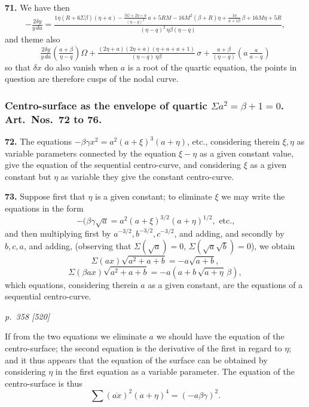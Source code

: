 \documentclass[11pt,a4paper]{book}
\begin{document}
\textbf{71.} We have then
\[
-\tfrac{2\delta y}{y\,da} = \tfrac{1\eta(R + 6\Sigma\beta)(\eta + a) - \tfrac{5G + 2\eta + a}{(\eta - q)^2}\,a + 5RM - 16M^2(\beta + R)\eta + \tfrac{1\eta}{a + 1\beta}\,\beta + 16M\eta + 5R}{(\eta - q)^2\,\eta\beta(\eta - q)},
\]
and theme also
\[
\tfrac{2\delta y}{y\,da}\!\!\left(\tfrac{a + \beta}{\eta - q}\!\right)\Omega + \tfrac{(2\eta + a)(2\eta + a)(\eta + a + a + 1)}{(\eta - q)\,\eta\beta}\,\sigma + \tfrac{a + \beta}{(\eta - q)}\!\left(a\,\tfrac{a}{a - q}\right)
\]
so that $\delta x$ do also vanish when $a$ is a root of the quartic equation, the points in question are therefore cusps of the nodal curve.

\subsubsection*{Centro-surface as the envelope of quartic $\Sigma a^2 = \beta + 1 = 0$. Art.\ Nos.\ 72 to 76.}

\textbf{72.} The equations $-\beta\gamma x^2 = a^2(a + \xi)^3(a + \eta)$, etc., considering therein $\xi, \eta$ as variable parameters connected by the equation $\xi - \eta$ as a given constant value, give the equation of the sequential centro-curve, and considering $\xi$ as a given constant but $\eta$ as variable they give the constant centro-curve.

\textbf{73.} Suppose first that $\eta$ is a given constant; to eliminate $\xi$ we may write the equations in the form
\[
-(\beta\gamma\sqrt{a} = a^2(a + \xi)^{3/2}(a + \eta)^{1/2},\text{ etc.,}
\]
and then multiplying first by $a^{-3/2}, b^{-3/2}, c^{-3/2}$, and adding, and secondly by $b, c, a$, and adding, (observing that $\Sigma\!\left(\sqrt{a}\right) = 0$, $\Sigma(\sqrt{a}\sqrt{b}) = 0$), we obtain
\[
\Sigma(a x)\sqrt{a^2 + a + b} = -a\sqrt{a + b},
\]
\[
\Sigma(\beta a x)\sqrt{a^2 + a + b} = -a(a + b\,\sqrt{a + \eta}\,\beta),
\]
which equations, considering therein $a$ as a given constant, are the equations of a sequential centro-curve.

\clearpage

\bigskip
\textit{p.~358 [520]}
\smallskip

If from the two equations we eliminate $a$ we should have the equation of the centro-surface; the second equation is the derivative of the first in regard to $\eta$; and it thus appears that the equation of the surface can be obtained by considering $\eta$ in the first equation as a variable parameter. The equation of the centro-surface is thus
\[
\sum (\overline{a x})^2 (a + \eta)^4 = (- a \beta \gamma)^2.
\]
\end{document}
